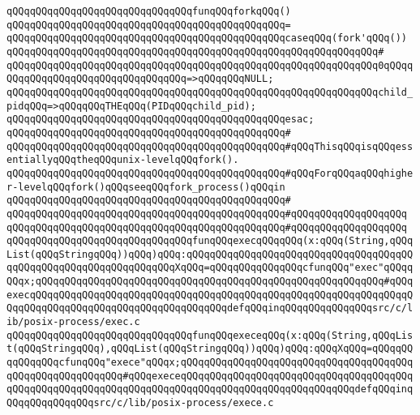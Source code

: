 \newline
\verb|qQQqqQQqqQQqqQQqqQQqqQQqqQQqqQQqfunqQQqforkqQQq()|\newline
\verb|qQQqqQQqqQQqqQQqqQQqqQQqqQQqqQQqqQQqqQQqqQQqqQQq=|\newline
\verb|qQQqqQQqqQQqqQQqqQQqqQQqqQQqqQQqqQQqqQQqqQQqqQQqcaseqQQq(fork'qQQq())|\newline
\verb|qQQqqQQqqQQqqQQqqQQqqQQqqQQqqQQqqQQqqQQqqQQqqQQqqQQqqQQqqQQqqQQq#|\newline
\verb|qQQqqQQqqQQqqQQqqQQqqQQqqQQqqQQqqQQqqQQqqQQqqQQqqQQqqQQqqQQqqQQq0qQQqqQQqqQQqqQQqqQQqqQQqqQQqqQQqqQQq=>qQQqqQQqNULL;|\newline
\verb|qQQqqQQqqQQqqQQqqQQqqQQqqQQqqQQqqQQqqQQqqQQqqQQqqQQqqQQqqQQqqQQqchild_pidqQQq=>qQQqqQQqTHEqQQq(PIDqQQqchild_pid);|\newline
\verb|qQQqqQQqqQQqqQQqqQQqqQQqqQQqqQQqqQQqqQQqqQQqqQQqesac;|\newline
\verb|qQQqqQQqqQQqqQQqqQQqqQQqqQQqqQQqqQQqqQQqqQQqqQQq#|\newline
\verb|qQQqqQQqqQQqqQQqqQQqqQQqqQQqqQQqqQQqqQQqqQQqqQQq#qQQqThisqQQqisqQQqessentiallyqQQqtheqQQqunix-levelqQQqfork().|\newline
\verb|qQQqqQQqqQQqqQQqqQQqqQQqqQQqqQQqqQQqqQQqqQQqqQQq#qQQqForqQQqaqQQqhigher-levelqQQqfork()qQQqseeqQQqfork_process()qQQqin|\newline
\verb|qQQqqQQqqQQqqQQqqQQqqQQqqQQqqQQqqQQqqQQqqQQqqQQq#|\newline
\verb|qQQqqQQqqQQqqQQqqQQqqQQqqQQqqQQqqQQqqQQqqQQqqQQq#qQQqqQQqqQQqqQQqqQQq|\newline
\verb|qQQqqQQqqQQqqQQqqQQqqQQqqQQqqQQqqQQqqQQqqQQqqQQq#qQQqqQQqqQQqqQQqqQQq|\newline
\newline
\newline
\verb|qQQqqQQqqQQqqQQqqQQqqQQqqQQqqQQqfunqQQqexecqQQqqQQq(x:qQQq(String,qQQqList(qQQqStringqQQq))qQQq)qQQq:qQQqqQQqqQQqqQQqqQQqqQQqqQQqqQQqqQQqqQQqqQQqqQQqqQQqqQQqqQQqqQQqqQQqXqQQq=qQQqqQQqqQQqqQQqcfunqQQq"exec"qQQqqQQqx;qQQqqQQqqQQqqQQqqQQqqQQqqQQqqQQqqQQqqQQqqQQqqQQqqQQqqQQqqQQq#qQQqexecqQQqqQQqqQQqqQQqqQQqqQQqqQQqqQQqqQQqqQQqqQQqqQQqqQQqqQQqqQQqqQQqqQQqqQQqqQQqqQQqqQQqqQQqqQQqqQQqqQQqqQQqdefqQQqinqQQqqQQqqQQqqQQqsrc/c/lib/posix-process/exec.c|\newline
\verb|qQQqqQQqqQQqqQQqqQQqqQQqqQQqqQQqfunqQQqexeceqQQq(x:qQQq(String,qQQqList(qQQqStringqQQq),qQQqList(qQQqStringqQQq))qQQq)qQQq:qQQqXqQQq=qQQqqQQqqQQqqQQqcfunqQQq"exece"qQQqx;qQQqqQQqqQQqqQQqqQQqqQQqqQQqqQQqqQQqqQQqqQQqqQQqqQQqqQQqqQQq#qQQqexeceqQQqqQQqqQQqqQQqqQQqqQQqqQQqqQQqqQQqqQQqqQQqqQQqqQQqqQQqqQQqqQQqqQQqqQQqqQQqqQQqqQQqqQQqqQQqqQQqqQQqdefqQQqinqQQqqQQqqQQqqQQqsrc/c/lib/posix-process/exece.c|\newline
